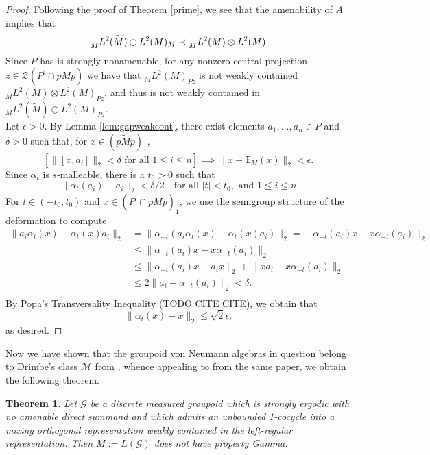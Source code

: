 \documentclass[a4paper,11pt]{article}
\numberwithin{equation}{section}
\newtheorem{thm}{Theorem}[section]
\theoremstyle{definition}
\theoremstyle{remark}
\numberwithin{equation}{section}
\newcommand{\rG}{\mathcal{G}}
\newcommand{\E}{\mathbb{E}}
\newcommand{\eps}{\epsilon}
\providecommand{\norm}[1]{\lVert#1\rVert}
\numberwithin{equation}{section}
\begin{document}
\begin{proof}
    Following the proof of Theorem \ref{prime}, we see that the amenability of $ A $ implies that 
    \[
        \prescript{}{M}{L^{2}(\widetilde{M})\ominus L^{2}(M)}_{M} \prec \prescript{}{M}{L^{2}(M)\otimes L^{2}(M)}
    \]
    Since $ P $ has is strongly nonamenable, for any nonzero central projection $ z\in \mathcal{Z}(P^{\prime}\cap pMp) $ we have that 
   $ _M L^{2}(M)_{Pz} $ is not weakly contained $ _M L^{2}(M) \otimes L^{2}(M)_{Pz} $, and thus is not weakly contained in $ _M L^{2}(\widetilde{M}) \ominus L^{2}(M)_{Pz} $.\\

   Let $ \eps>0 $. By Lemma \ref{lem:gapweakcont}, there exist elements $ a_{1}, \ldots, a_{n}\in P $ and $ \delta>0 $ such that, for $ x\in (p \widetilde{M} p)_{1} $,
   \[
   \left[\norm{[x,a_{i}]}_{2} <\delta \text{ for all }1\leq i \leq n\right] \implies \norm{x-\E_{M}(x)}_{2}<\eps.
   \]
   Since $ \alpha_{t} $ is $ s $-malleable, there is a $ t_{0}>0 $ such that
   \[
       \norm{\alpha_{t}(a_{i})-a_{i}}_{2} < \delta/2\quad\text{for all }|t|<t_{0}, \text{ and }1\leq i \leq n
   \]
   For $ t\in (-t_{0},t_{0}) $ and $ x\in (P^{\prime}\cap pMp)_{1} $, we use the semigroup structure of the deformation to compute
   \begin{align*}
       \norm{a_{i}\alpha_{t}(x) - \alpha_{t}(x) a_{i}}_{2} &= \norm{\alpha_{-t}( a_{i} \alpha_{t}(x) - \alpha_{t}(x)a_{i})}_{2}= \norm{\alpha_{-t}(a_{i}) x - x \alpha_{-t}(a_{i})}_{2} \\
       &\leq\norm{\alpha_{-t}(a_{i}) x - x \alpha_{-t}(a_{i})}_{2} \\
       &\leq\norm{\alpha_{-t}(a_{i}) x -a_{i}x}_{2}+ \norm{xa_{i} -x \alpha_{-t}(a_{i})}_{2} \\
       &\leq 2 \norm{a_{i}-\alpha_{-t}(a_{i})}_{2} < \delta. \\
   \end{align*}
   By Popa's Transversality Inequality (TODO CITE CITE), we obtain that
   \[
       \norm{\alpha_{t}(x)-x}_{2}\leq \sqrt{2} \eps.
   \]
   as desired.
    
\end{proof}

Now we have shown that the groupoid von Neumann algebras in question belong to Drimbe's class $ \mathcal{M} $ from \cite[3.2]{drimbe:21}, whence appealing to \cite[Lemma 3.7]{drimbe:21} from the same paper, we obtain the following theorem.

\begin{thm}
     Let $\rG$ be a discrete measured groupoid which is strongly ergodic with no amenable direct summand and which admits an unbounded 1-cocycle into a mixing orthogonal representation weakly contained in the left-regular representation. Then $ M:=L(\rG) $ does not have property Gamma.
\end{thm}




\printbibliography
\end{document}
